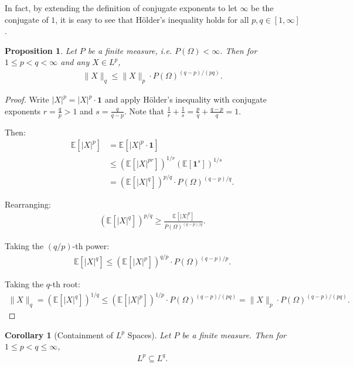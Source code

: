 \documentclass[11pt,reqno]{amsart}
\newtheorem{corollary}[theorem]{Corollary}
\newtheorem{proposition}[theorem]{Proposition}
\theoremstyle{definition}
\theoremstyle{remark}
\begin{document}
In fact, by extending the definition of conjugate exponents to let $\infty$ be the conjugate of \(1\), it is easy to see that Hölder's inequality holds for all \(p, q \in [1, \infty]\).

\begin{proposition}
	Let \(P\) be a finite measure, i.e. \(P(\Omega) < \infty\). Then for \(1 \leq p < q < \infty\) and any $X \in L^p$,
	\begin{align*}
		\|X\|_q \leq \|X\|_p \cdot P(\Omega)^{(q-p)/(pq)}.
	\end{align*}
\end{proposition}

\begin{proof}
	Write $|X|^p = |X|^p \cdot \mathbf{1}$ and apply Hölder's inequality with conjugate exponents $r = \frac{q}{p} > 1$ and $s = \frac{q}{q-p}$. Note that $\frac{1}{r} + \frac{1}{s} = \frac{p}{q} + \frac{q-p}{q} = 1$.

	Then:
	\begin{align*}
		\mathbb{E}[|X|^p] & = \mathbb{E}[|X|^p \cdot \mathbf{1}]                               \\
		                  & \leq (\mathbb{E}[|X|^{pr}])^{1/r} (\mathbb{E}[\mathbf{1}^s])^{1/s} \\
		                  & = (\mathbb{E}[|X|^q])^{p/q} \cdot P(\Omega)^{(q-p)/q}.
	\end{align*}

	Rearranging:
	\begin{align*}
		(\mathbb{E}[|X|^q])^{p/q} \geq \frac{\mathbb{E}[|X|^p]}{P(\Omega)^{(q-p)/q}}.
	\end{align*}

	Taking the $(q/p)$-th power:
	\begin{align*}
		\mathbb{E}[|X|^q] \leq \left(\mathbb{E}[|X|^p]\right)^{q/p} \cdot P(\Omega)^{(q-p)/p}.
	\end{align*}

	Taking the $q$-th root:
	\begin{align*}
		\|X\|_q = (\mathbb{E}[|X|^q])^{1/q} \leq \left(\mathbb{E}[|X|^p]\right)^{1/p} \cdot P(\Omega)^{(q-p)/(pq)} = \|X\|_p \cdot P(\Omega)^{(q-p)/(pq)}.
	\end{align*}
\end{proof}

\begin{corollary}[Containment of \(L^p\) Spaces]
	Let \(P\) be a finite measure. Then for \(1 \leq p < q \leq \infty\),
	\begin{align*}
		L^p \subseteq L^q.
	\end{align*}
\end{corollary}
\end{document}
